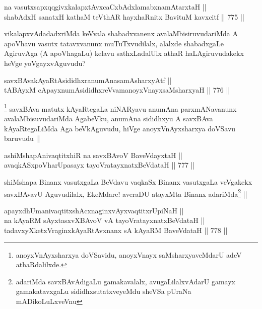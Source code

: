 \begin{shl}
na vasutxsapxqqgivxkalapxtAvxcaCxbAdxlamabxnamAtarxtaH || \\
shabAdxH sanatxH kathaM teV\s thAR hayxhaRnitx BavituM kavxcitf ||  775 ||  
\end{shl}

\begin{artha}
vikalapxvAdadadxriMda keVvala shabadxvanenx avalaMbisiruvudariMda A apoVhavu vasutx tatavxvanunx muTuTxvudilalx, alalxde shabadxgaLe AgiruvAga (A apoVhagaLu) kelavu sathxLadalUlx athaR haLAgiruvudakekx heVge yoVgayxvAguvudu?
\end{artha}

\begin{shl}
savxBAvakAyaRtAsididhxranumAnasamAsharxyAtf || \\
tABAyxM cApayxnumAsididhxreVvamanoyxVnayxsaMsharxyaH ||  776 ||  
\end{shl}

\begin{artha}
\footnote{anoyxVnAyxsharxya doVSavidu, anoyxVnayx saMsharxyaveMdarU adeV athaRdalilxde.}
savxBAva matutx kAyaRtegaLa niNARyavu anumAna parxmANavanunx avalaMbisuvudariMda AgabeVku, anumAna sididhxyu A savxBAva kAyaRtegaLiMda Aga beVkAguvudu, hiVge anoyxVnAyxsharxya doVSavu baruvudu ||
\end{artha}


\begin{shl}
ashiMshapAnivaqtitxhiR na savxBAvoV BaveVdayxtaH || \\
avaqkASxpoVharUpasayx tayoVratayxnatxBeVdataH ||  777 ||  
\end{shl}

\begin{artha}
shiMshapa Binanx vasutxgaLa BeVdavu vaqkaSx Binanx vasutxgaLa veVgakekx savxBAvavU Aguvudilalx, EkeMdare! averaDU atayxMta Binanx adariMda\footnote{adariMda savxBAvAdigaLu gamakavalalx, avugaLilalxvAdarU gamayx gamakatavxgaLu sididhxsutatxveyeMdu sheVSa pUraNa mADikoLuLxveVnu} ||
\end{artha}

\begin{shl}
apayxdhUmanivaqtitxshAcxnaginxvAyxvaqtitxrUpiNaH || \\
na kAyaRM sAyxtasxvXBAvoV vA tayoVratayxnatxBeVdataH || \\
tadavxyXketxVraginxkAyaRtAvxnanx sA kAyaRM BaveVdataH ||  778 ||  
\end{shl}

